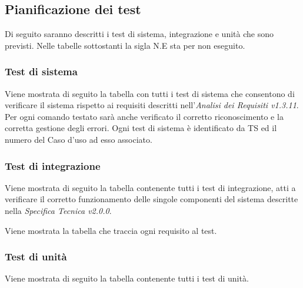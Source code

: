 \documentclass[a4paper]{article}
\begin{document}
	
	
	\subsection{Pianificazione dei test}
		Di seguito saranno descritti i test di sistema, integrazione e unità che sono previsti.
		Nelle tabelle sottostanti la sigla N.E sta per non eseguito.
		
					
	\subsubsection{Test di sistema}
		Viene mostrata di seguito la tabella con tutti i test di sistema che consentono di verificare il sistema rispetto ai requisiti descritti nell'\emph{Analisi dei Requisiti v1.3.11}.
		Per ogni comando testato sarà anche verificato il corretto riconoscimento e la corretta gestione degli errori.
		Ogni test di sistema è identificato da TS ed il numero del Caso d'uso ad esso associato.
		
	\subsubsection{Test di integrazione}
		Viene mostrata di seguito la tabella contenente tutti i test di integrazione, atti a verificare il corretto funzionamento delle singole componenti del sistema descritte nella \emph{Specifica Tecnica v2.0.0}. 
	
	Viene mostrata la tabella che traccia ogni requisito al test.
	
	\subsubsection{Test di unità}
		Viene mostrata di seguito la tabella contenente tutti i test di unità. 
		
		
			
\end{document}
